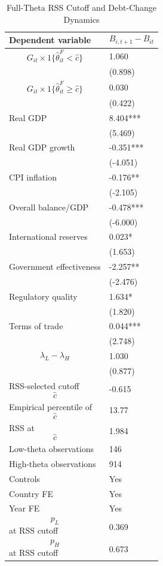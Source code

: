 \begin{table}[H]\centering
\begin{threeparttable}
\caption{Full-Theta RSS Cutoff and Debt-Change Dynamics}
\label{tab:deltaB_rss_cutoff_fulltheta}
\scriptsize
\begin{tabularx}{\textwidth}{lY}
\toprule
Dependent variable & $$B_{i,t+1}-B_{it}$$ \\
\midrule
$$G_{it}\times 1\{\widehat{\theta}^{F}_{it}<\widehat{c}\}$$ & 1.060 \\
 & (0.898) \\
$$G_{it}\times 1\{\widehat{\theta}^{F}_{it}\geq\widehat{c}\}$$ & 0.030 \\
 & (0.422) \\
Real GDP & 8.404*** \\
 & (5.469) \\
Real GDP growth & -0.351*** \\
 & (-4.051) \\
CPI inflation & -0.176** \\
 & (-2.105) \\
Overall balance/GDP & -0.478*** \\
 & (-6.000) \\
International reserves & 0.023* \\
 & (1.653) \\
Government effectiveness & -2.257** \\
 & (-2.476) \\
Regulatory quality & 1.634* \\
 & (1.820) \\
Terms of trade & 0.044*** \\
 & (2.748) \\
$$\lambda_L-\lambda_H$$ & 1.030 \\
 & (0.877) \\
\midrule
RSS-selected cutoff $$\widehat{c}$$ & -0.615 \\
Empirical percentile of $$\widehat{c}$$ & 13.77 \\
RSS at $$\widehat{c}$$ & 1.984 \\
Low-theta observations & 146 \\
High-theta observations & 914 \\
Controls & Yes \\
Country FE & Yes \\
Year FE & Yes \\
$$p_L$$ at RSS cutoff & 0.369 \\
$$p_H$$ at RSS cutoff & 0.673 \\

\end{tabularx}
\end{threeparttable}
\end{table}

